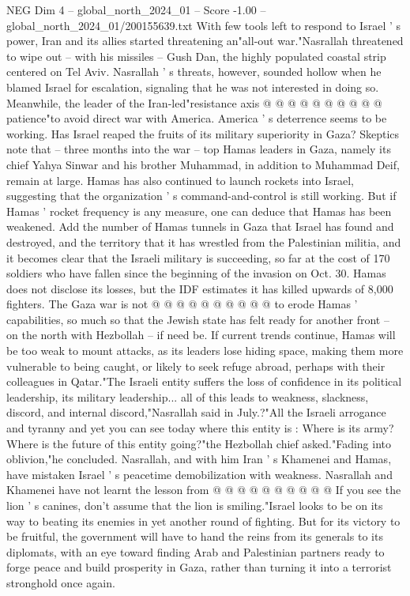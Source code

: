 \begin{textsample}{NEG Dim 4 – global\_north\_2024\_01 – Score -1.00 – global\_north\_2024\_01/200155639.txt}
With few tools left to respond to Israel ' s power, Iran and its allies started threatening an"all-out war."Nasrallah threatened to wipe out -- with his missiles -- Gush Dan, the highly populated coastal strip centered on Tel Aviv.
Nasrallah ' s threats, however, sounded hollow when he blamed Israel for escalation, signaling that he was not interested in doing so.
Meanwhile, the leader of the Iran-led"resistance axis @ @ @ @ @ @ @ @ @ @ patience"to avoid direct war with America.
America ' s deterrence seems to be working.
Has Israel reaped the fruits of its military superiority in Gaza?
Skeptics note that -- three months into the war -- top Hamas leaders in Gaza, namely its chief Yahya Sinwar and his brother Muhammad, in addition to Muhammad Deif, remain at large.
Hamas has also continued to launch rockets into Israel, suggesting that the organization ' s command-and-control is still working.
But if Hamas ' rocket frequency is any measure, one can deduce that Hamas has been weakened.
Add the number of Hamas tunnels in Gaza that Israel has found and destroyed, and the territory that it has wrestled from the Palestinian militia, and it becomes clear that the Israeli military is succeeding, so far at the cost of 170 soldiers who have fallen since the beginning of the invasion on Oct. 30.
Hamas does not disclose its losses, but the IDF estimates it has killed upwards of 8,000 fighters.
The Gaza war is not @ @ @ @ @ @ @ @ @ @ to erode Hamas ' capabilities, so much so that the Jewish state has felt ready for another front -- on the north with Hezbollah -- if need be.
If current trends continue, Hamas will be too weak to mount attacks, as its leaders lose hiding space, making them more vulnerable to being caught, or likely to seek refuge abroad, perhaps with their colleagues in Qatar."The Israeli entity suffers the loss of confidence in its political leadership, its military leadership... all of this leads to weakness, slackness, discord, and internal discord,"Nasrallah said in July.?"All the Israeli arrogance and tyranny and yet you can see today where this entity is : Where is its army?
Where is the future of this entity going?"the Hezbollah chief asked."Fading into oblivion,"he concluded.
Nasrallah, and with him Iran ' s Khamenei and Hamas, have mistaken Israel ' s peacetime demobilization with weakness.
Nasrallah and Khamenei have not learnt the lesson from @ @ @ @ @ @ @ @ @ @ If you see the lion ' s canines, don't assume that the lion is smiling."Israel looks to be on its way to beating its enemies in yet another round of fighting.
But for its victory to be fruitful, the government will have to hand the reins from its generals to its diplomats, with an eye toward finding Arab and Palestinian partners ready to forge peace and build prosperity in Gaza, rather than turning it into a terrorist stronghold once again.

\end{textsample}
